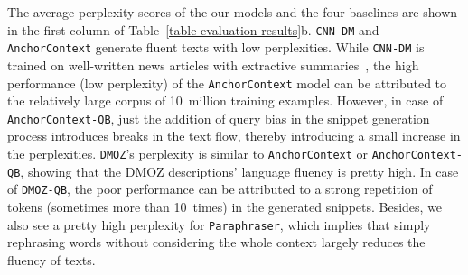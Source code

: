 \documentclass[sigconf]{acmart}
\begin{document}
The average perplexity scores of the our models and the four baselines are shown in the first column of Table~\ref{table-evaluation-results}b. {\small\tt CNN-DM} and {\small\tt AnchorContext} generate fluent texts with low perplexities. While {\small\tt CNN-DM} is trained on well-written news articles with extractive summaries~\cite{grusky:2018}, the high performance (low perplexity) of the {\small\tt Anchor\-Context} model can be attributed to the relatively large corpus of 10~million training examples. However, in case of {\small\tt AnchorContext-QB}, just the addition of query bias in the snippet generation process introduces breaks in the text flow, thereby introducing a small increase in the perplexities. {\small\tt DMOZ}'s perplexity is similar to {\small\tt AnchorCon\-text} or {\small\tt AnchorContext-QB}, showing that the DMOZ descriptions' language fluency is pretty high. In case of {\small\tt DMOZ-QB}, the poor performance can be attributed to a strong repetition of tokens (sometimes more than 10~times) in the generated snippets. Besides, we also see a pretty high perplexity for {\small\tt Paraphraser}, which implies that simply rephrasing words without considering the whole context largely reduces the fluency of texts.
\end{document}
